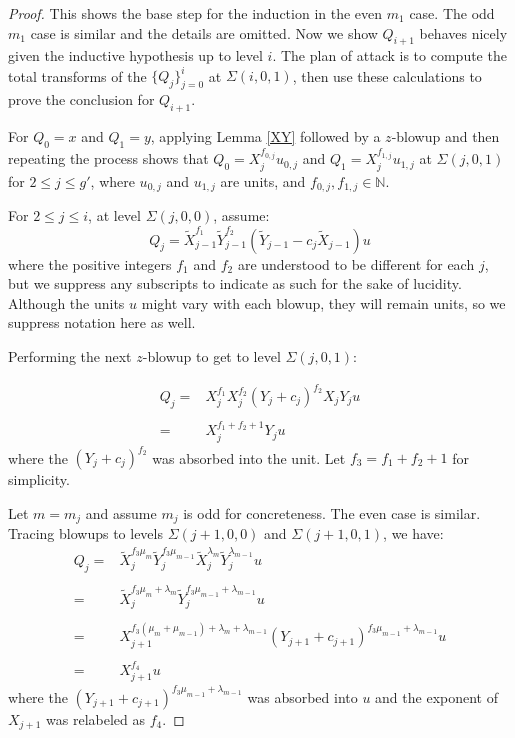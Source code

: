 \documentclass[11pt]{amsart}
\theoremstyle{definition}
\begin{document}
{\begin{proof}
This shows the base step for the induction in the even $m_1$ case. The odd $m_1$ case is similar and the details are omitted. Now we show $Q_{i+1}$ behaves nicely given the inductive hypothesis up to level $i$. The plan of attack is to compute the total transforms of the $\{Q_j\}_{j=0}^{i}$ at $\Sigma(i,0,1)$, then use these calculations to prove the conclusion for $Q_{i+1}$.

For $Q_0=x$ and $Q_1=y$, applying Lemma \ref{XY} followed by a $z$-blowup and then repeating the process shows that $Q_0=X_j^{f_{0,j}}u_{0,j}$ and $Q_1=X_j^{f_{1,j}}u_{1,j}$ at $\Sigma(j,0,1)$ for $2\leq j \leq g'$, where $u_{0,j}$ and $u_{1,j}$ are units, and $f_{0,j},f_{1,j}\in\mathbb{N}$.

For $2\leq j \leq i$, at level $\Sigma(j,0,0)$, assume:
\begin{equation*}
Q_j=\tilde X_{j-1}^{f_1} \tilde Y_{j-1}^{f_2} \left(\tilde Y_{j-1} - c_j \tilde X_{j-1}\right) u
\end{equation*}
where the positive integers $f_1$ and $f_2$ are understood to be different for each $j$, but we suppress any subscripts to indicate as such for the sake of lucidity. Although the units $u$ might vary with each blowup, they will remain units, so we suppress notation here as well.

Performing the next $z$-blowup to get to level $\Sigma(j,0,1)$:

\begin{equation*}
\begin{array}{rl}
\displaystyle Q_j= & X_{j}^{f_1}X_{j}^{f_2}\left(Y_{j}+c_j\right)^{f_2}X_{j}Y_{j} u
\\\\
\displaystyle = & X_{j}^{f_1+f_2+1}Y_{j} u
\end{array}
\end{equation*}
where the $\left(Y_{j}+c_j\right)^{f_2}$ was absorbed into the unit. Let $f_3=f_1+f_2+1$ for simplicity.

Let $m=m_j$ and assume $m_j$ is odd for concreteness. The even case is similar. Tracing blowups to levels $\Sigma(j+1,0,0)$ and $\Sigma(j+1,0,1)$, we have:
\begin{equation*}
\begin{array}{rl}
\displaystyle Q_j=&\tilde X_{j}^{f_3\mu_{m}} \tilde Y_{j}^{f_3\mu_{m-1}} \tilde X_{j}^{\lambda_{m}} \tilde Y_{j}^{\lambda_{m-1}}u
\\\\
\displaystyle =&\tilde X_{j}^{f_3\mu_{m}+\lambda_m} \tilde Y_{j}^{f_3\mu_{m-1}+\lambda_{m-1}}u
\\\\
\displaystyle =& X_{j+1}^{f_3(\mu_{m}+\mu_{m-1})+\lambda_m+\lambda_{m-1}} (Y_{j+1}+c_{j+1})^{f_3\mu_{m-1}+\lambda_{m-1}}u
\\\\
\displaystyle =& X_{j+1}^{f_4}u
\end{array}
\end{equation*}
where the $(Y_{j+1}+c_{j+1})^{f_3\mu_{m-1}+\lambda_{m-1}}$ was absorbed into $u$ and the exponent of $X_{j+1}$ was relabeled as $f_4$.


\end{proof}}
\end{document}
